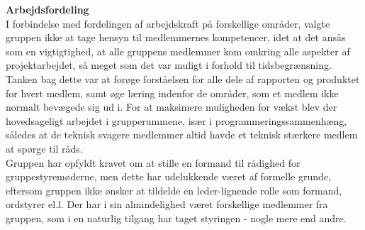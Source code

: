 









\textbf{Arbejdsfordeling}\\ %
I forbindelse med fordelingen af arbejdskraft på forskellige områder, valgte gruppen ikke at tage hensyn til medlemmernes kompetencer, idet at det ansås som en vigtigtighed, at alle gruppens medlemmer kom omkring alle aspekter af projektarbejdet, så meget som det var muligt i forhold til tidsbegrænsning. Tanken bag dette var at forøge forståelsen for alle dele af rapporten og produktet for hvert medlem, samt øge læring indenfor de områder, som et medlem ikke normalt bevægede sig ud i. For at maksimere muligheden for vækst blev der hovedsageligt arbejdet i grupperummene, især i programmeringssammenhæng, således at de teknisk svagere medlemmer altid havde et teknisk stærkere medlem at spørge til råds.\\
Gruppen har opfyldt kravet om at stille en formand til rådighed for gruppestyremøderne, men dette har udelukkende været af formelle grunde, eftersom gruppen ikke ønsker at tildelde en leder-lignende rolle som formand, ordstyrer el.l. Der har i sin almindelighed været forskellige medlemmer fra gruppen, som i en naturlig tilgang har taget styringen - nogle mere end andre. 

